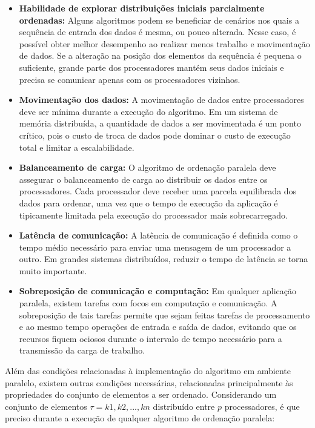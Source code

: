 \begin{itemize}
\item \textbf{Habilidade de explorar distribuições iniciais parcialmente ordenadas:}
Alguns algoritmos podem se beneficiar de cenários nos quais a sequência de entrada dos dados é mesma, ou pouco alterada. Nesse caso, é possível obter melhor desempenho ao realizar menos trabalho e movimentação de dados.
Se a alteração na posição dos elementos da sequência é pequena o suficiente, grande parte dos processadores mantém seus dados iniciais e precisa se comunicar apenas com os processadores vizinhos.

\item \textbf{Movimentação dos dados:}
A movimentação de dados entre processadores deve ser mínima durante a execução do algoritmo. Em um sistema de memória distribuída, a quantidade de dados a ser movimentada é um ponto crítico, pois o custo de troca de dados pode dominar o custo de execução total e limitar a escalabilidade.

\item \textbf{Balanceamento de carga:}
O algoritmo de ordenação paralela deve assegurar o balanceamento de carga ao distribuir os dados entre os processadores. Cada processador deve receber uma parcela equilibrada dos dados para ordenar, uma vez que o tempo de execução da aplicação é tipicamente limitada pela execução do processador mais sobrecarregado.

\item \textbf{Latência de comunicação:}
A latência de comunicação é definida como o tempo médio necessário para enviar uma mensagem de um processador a outro.
Em grandes sistemas distribuídos, reduzir o tempo de latência se torna muito importante.

\item \textbf{Sobreposição de comunicação e computação:}
Em qualquer aplicação paralela, existem tarefas com focos em computação e comunicação. A sobreposição de tais tarefas permite que sejam feitas tarefas de processamento e ao mesmo tempo operações de entrada e saída de dados, evitando que os recursos fiquem ociosos durante o intervalo de tempo necessário para a transmissão da carga de trabalho.

\end{itemize}


Além das condições relacionadas à implementação do algoritmo em ambiente paralelo, existem outras condições necessárias, relacionadas principalmente às propriedades do conjunto de elementos a ser ordenado. Considerando um conjunto de elementos $ \tau = {k1, k2, ... , kn} $ distribuído entre $p$ processadores, é que preciso durante a execução de qualquer algoritmo de ordenação paralela: 

